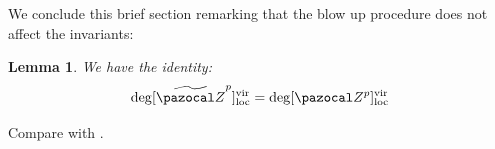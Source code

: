 \documentclass[11pt]{amsart}
\newcommand{\PP}{\mathbb P}
\renewcommand{\to}{\rightarrow}
\newcommand{\X}{\pazocal X}
\newcommand{\XP}{\pazocal{X\!P}}
\newcommand{\hL}{\hat{\mathcal L}}
\newcommand{\cC}{\mathcal C}
\newcommand{\Z}{\pazocal Z}
\newcommand{\Zp}{\pazocal Z^p}
\newcommand{\tZp}{\widetilde{\pazocal Z}^p}
\newcommand{\MM}{\mathfrak M}
\newcommand{\oM}{\overline{\pazocal M}}
\newcommand{\virloc}[1]{[#1]^{\rm{vir}}_{\rm{loc}}}
\newcommand{\bcd}{\begin{center}\begin{tikzcd}}
\newcommand{\ecd}{\end{tikzcd}\end{center}}
\newcommand{\Pic}{\operatorname{Pic}}
\theoremstyle{plain}
\newtheorem{lem}[thm]{Lemma}
\theoremstyle{definition}
\begin{document}

We conclude this brief section remarking that the blow up procedure does not affect the invariants:
\begin{lem}
We have the identity:
\[\deg\virloc{\tZp}=\deg\virloc{\Zp}\]
\end{lem}
Compare with \cite[Proposition~2.5]{CL}.
\end{document}
